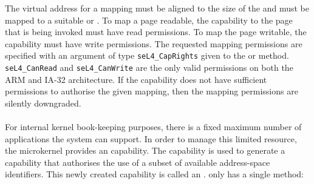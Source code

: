 \vspace{2ex}

\vspace{2ex}

The virtual address for a  mapping
must be aligned to
the size of the  and must be mapped to a suitable 
or . To map a page readable, the capability
to the page
that is being invoked must have read permissions. To map the page
writable, the capability must have write permissions. The requested
mapping permissions are specified with an argument of type
\texttt{seL4\_CapRights} given to the  \ifxeightsix or  \fi method.
\texttt{seL4\_CanRead} and \texttt{seL4\_CanWrite} are the only valid
permissions on \ifxeightsix both \else the \fi ARM \ifxeightsix and IA-32 \fi architecture\fi. If the capability does not have
sufficient permissions to authorise the given mapping, then
the mapping permissions are silently downgraded.

\paragraph{}

For internal kernel book-keeping purposes, there is a fixed maximum
number of applications the system can support.  In order to manage
this limited resource, the microkernel provides an 
capability. The  capability is used to generate a
capability that authorises the use of a subset of available address-space identifiers.
This newly created capability is called an
.  only has a single method:
\vspace{2ex}\\
\vspace{2ex}

